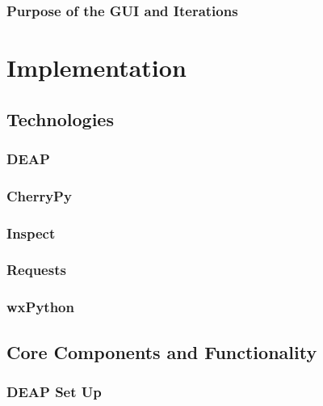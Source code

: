 \documentclass{l4proj}
\begin{document}
\subsection{Purpose of the GUI and Iterations}



\chapter{Implementation}


\section{Technologies}


\subsection{DEAP}


\subsection{CherryPy}


\subsection{Inspect}


\subsection{Requests}


\subsection{wxPython}


\section{Core Components and Functionality}


\subsection{DEAP Set Up}

\end{document}
